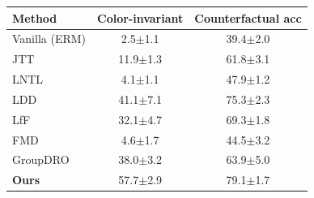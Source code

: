 \begin{tabular}{lcc}
\toprule
Method & Color-invariant & Counterfactual acc \\
\midrule
Vanilla (ERM) & 2.5{\scriptsize$\pm$1.1} & 39.4{\scriptsize$\pm$2.0} \\
JTT & 11.9{\scriptsize$\pm$1.3} & 61.8{\scriptsize$\pm$3.1} \\
LNTL & 4.1{\scriptsize$\pm$1.1} & 47.9{\scriptsize$\pm$1.2} \\
LDD & 41.1{\scriptsize$\pm$7.1} & 75.3{\scriptsize$\pm$2.3} \\
LfF & 32.1{\scriptsize$\pm$4.7} & 69.3{\scriptsize$\pm$1.8} \\
FMD & 4.6{\scriptsize$\pm$1.7} & 44.5{\scriptsize$\pm$3.2} \\
GroupDRO & 38.0{\scriptsize$\pm$3.2} & 63.9{\scriptsize$\pm$5.0} \\
\textbf{Ours} & 57.7{\scriptsize$\pm$2.9} & 79.1{\scriptsize$\pm$1.7} \\
\bottomrule
\end{tabular}
